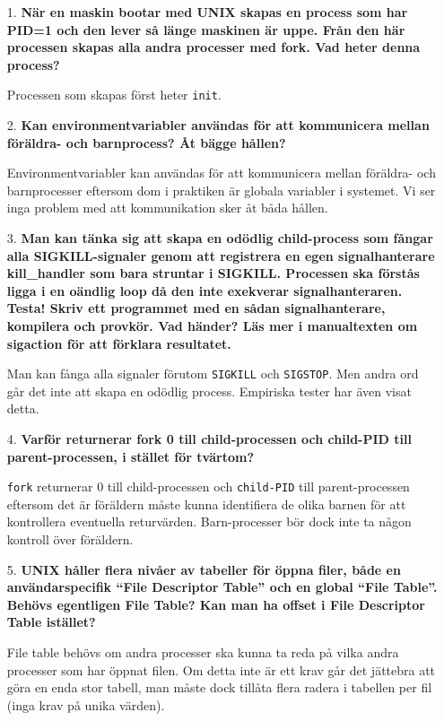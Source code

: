 \documentclass[a4paper,10pt,titlepage]{article}
\begin{document}
\begin{enumerate}
	\item[1.] \textbf{\footnotesize När en maskin bootar med UNIX skapas en process som har PID=1 och den lever så länge maskinen är uppe. Från den här processen skapas alla andra processer med fork. Vad heter denna process?}
	
	Processen som skapas först heter \verb!init!.

	\item[2.] \textbf{\footnotesize Kan environmentvariabler användas för att kommunicera mellan föräldra- och barnprocess? Åt bägge hållen?}

	Environmentvariabler kan användas för att kommunicera mellan föräldra- och barnprocesser eftersom dom i praktiken är globala variabler i systemet. Vi ser inga problem med att kommunikation sker åt båda hållen.

	\item[3.] \textbf{\footnotesize Man kan tänka sig att skapa en odödlig child-process som fångar alla SIGKILL-signaler genom att registrera en egen signalhanterare kill\_handler som bara struntar i SIGKILL. Processen ska förstås ligga i en oändlig loop då den inte exekverar signalhanteraren. Testa! Skriv ett programmet med en sådan signalhanterare, kompilera och provkör. Vad händer? Läs mer i manualtexten om sigaction för att förklara resultatet.}

	Man kan fånga alla signaler förutom \verb!SIGKILL! och \verb!SIGSTOP!. Men andra ord går det inte att skapa en odödlig process. Empiriska tester har även visat detta.

	\item[4.] \textbf{\footnotesize Varför returnerar fork 0 till child-processen och child-PID till parent-processen, i stället för tvärtom?}

	\verb!fork! returnerar 0 till child-processen och \verb!child-PID! till parent-processen eftersom det är föräldern måste kunna identifiera de olika barnen för att kontrollera eventuella returvärden. Barn-processer bör dock inte ta någon kontroll över föräldern.

	\item[5.] \textbf{\footnotesize UNIX håller flera nivåer av tabeller för öppna filer, både en användarspecifik ``File Descriptor Table'' och en global ``File Table''. Behövs egentligen File Table? Kan man ha offset i File Descriptor Table istället?}

	File table behövs om andra processer ska kunna ta reda på vilka andra processer som har öppnat filen. Om detta inte är ett krav går det jättebra att göra en enda stor tabell, man måste dock tillåta flera radera i tabellen per fil (inga krav på unika värden).


\end{enumerate}
\end{document}
